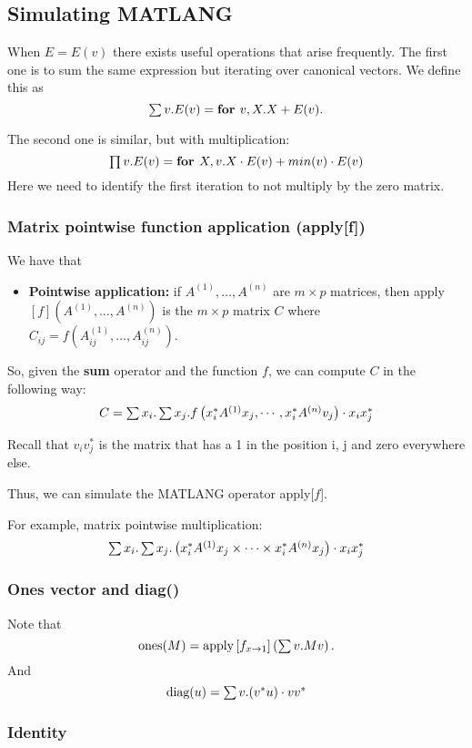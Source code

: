 \subsection{Simulating MATLANG}

When $E=E(v)$ there exists useful operations that arise frequently. The first one is to sum the same expression but iterating over canonical vectors. We define this as $$\textstyle\sum v. E(v)=\textbf{for } v, X. X + E(v).$$

The second one is similar, but with multiplication: $$\textstyle\prod v. E(v)=\textbf{for } X,v. X\cdot E(v) + min(v)\cdot E(v)$$
Here we need to identify the first iteration to not multiply by the zero matrix.

\subsubsection{Matrix pointwise function application (apply[f])}

We have that 

\begin{itemize}
	\item \textbf{Pointwise application:} if $A^{(1)}, \ldots, A^{(n)}$ are $m\times p$ matrices, then apply$\left[ f \right](A^{(1)}, \ldots, A^{(n)})$ is the $m\times p$ matrix $C$ where $C_{ij}=f(A^{(1)}_{ij}, \ldots, A^{(n)}_{ij})$.
\end{itemize}

So, given the \textbf{sum} operator and the function $f$, we can compute $C$ in the following way: $$C=\textstyle\sum x_i.\textstyle\sum x_j. f\left( x_i^*A^{(1)}x_j, \cdots, x_i^*A^{(n)}v_j\right)\cdot x_ix_j^*$$

Recall that $v_iv_j^*$ is the matrix that has a 1 in the position i, j and zero everywhere else.

Thus, we can simulate the MATLANG operator apply[$f$].

For example, matrix pointwise multiplication: $$\textstyle\sum x_i.\textstyle\sum x_j.\left( x_i^*A^{(1)}x_j\times \cdots\times x_i^*A^{(n)}x_j\right)\cdot x_ix_j^*$$

\subsubsection{Ones vector and diag()}

Note that $$\text{ones}(M)=\text{apply}\left[ f_{x\rightarrow 1}\right] \left(\textstyle\sum v. Mv\right).$$ And $$\text{diag}(u)=\textstyle\sum v. (v^*u)\cdot vv^*$$

\subsubsection{Identity}

